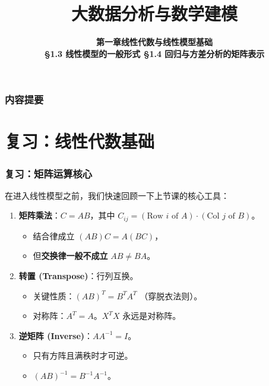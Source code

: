 
\title[大数据分析与数学建模]{\texorpdfstring{\LARGE \bfseries 大数据分析与数学建模}{大数据分析与数学建模}}
\author[线性模型基础(2)]
{\Large \bfseries 第一章\quad 线性代数与线性模型基础 \\ \vspace{0.5em} \large \S 1.3 线性模型的一般形式 \quad \S 1.4 回归与方差分析的矩阵表示}
\date{}





\begin{frame}
\titlepage
\end{frame}


\begin{frame}
\frametitle{内容提要}
\tableofcontents
\end{frame}


\section[复习]{复习：线性代数基础}


\begin{frame}
\frametitle{复习：矩阵运算核心}

在进入线性模型之前，我们快速回顾一下上节课的核心工具：

\begin{enumerate}
    \item \textbf{矩阵乘法}：$C = AB$，其中 $C_{ij} = (\text{Row } i \text{ of } A) \cdot (\text{Col } j \text{ of } B)$。
    \begin{itemize}
        \item 结合律成立 $(AB)C = A(BC)$，
        \item 但\textbf{交换律一般不成立} $AB \neq BA$。
    \end{itemize}
    \item \textbf{转置 (Transpose)}：行列互换。
    \begin{itemize}
        \item 关键性质：$(AB)^T = B^T A^T$ （穿脱衣法则）。
        \item 对称阵：$A^T = A$。$X^T X$ 永远是对称阵。
    \end{itemize}
    \item \textbf{逆矩阵 (Inverse)}：$A A^{-1} = I$。
    \begin{itemize}
        \item 只有方阵且满秩时才可逆。
        \item $(AB)^{-1} = B^{-1} A^{-1}$。
    \end{itemize}
\end{enumerate}

\end{frame}

